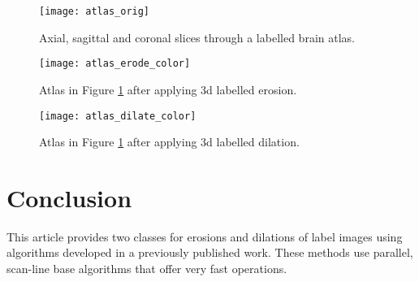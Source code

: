 \documentclass{InsightArticle}
\begin{document}
\begin{figure}[htbp]
\centering
\texttt{[image: atlas\_orig]}
\caption{Axial, sagittal and coronal slices through a labelled brain atlas.\label{fig:3dorig}}
\end{figure}

\begin{figure}[htbp]
\centering
\texttt{[image: atlas\_erode\_color]}
\caption{Atlas in Figure \ref{fig:3dorig} after applying 3d labelled erosion. \label{fig:3dero}}
\end{figure}

\begin{figure}[htbp]
\centering
\texttt{[image: atlas\_dilate\_color]}
\caption{Atlas in Figure \ref{fig:3dorig} after applying 3d labelled dilation. \label{fig:3ddil}}
\end{figure}



\section{Conclusion}
This article provides two classes for erosions and dilations of label
images using algorithms developed in a previously published
work. These methods use parallel, scan-line base algorithms that offer
very fast operations.


\nocite{ITKSoftwareGuide}
\end{document}

